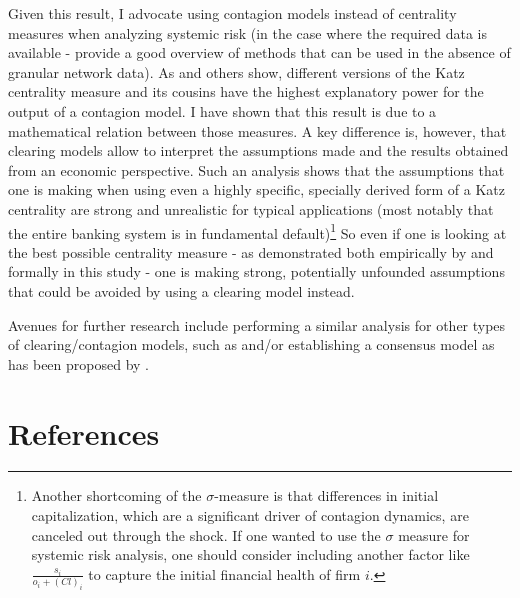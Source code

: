 \documentclass[authoryear,12pt]{elsarticle}
\begin{document}
Given this result, I advocate using contagion models instead of centrality measures when analyzing systemic risk (in the case where the required data is available - \cite{Anand2015} provide a good overview of methods that can be used in the absence of granular network data). As \cite{Puhr2014} and others show, different versions of the Katz centrality measure and its cousins have the highest explanatory power for the output of a contagion model. I have shown that this result is due to a mathematical relation between those measures. A key difference is, however, that clearing models allow to interpret the assumptions made and the results obtained from an economic perspective. Such an analysis shows that the assumptions that one is making when using even a highly specific, specially derived form of a Katz centrality are strong and unrealistic for typical applications (most notably that the entire banking system is in fundamental default)\footnote{Another shortcoming of the $\sigma$-measure is that differences in initial capitalization, which are a significant driver of contagion dynamics, are canceled out through the shock. If one wanted to use the $\sigma$ measure for systemic risk analysis, one should consider including another factor like $\frac{s_i}{o_i + (Cl)_i}$ to capture the initial financial health of firm $i$.} So even if one is looking at the best possible centrality measure - as demonstrated both empirically by \cite{Puhr2014} and formally in this study - one is making strong, potentially unfounded assumptions that could be avoided by using a clearing model instead. 

Avenues for further research include performing a similar analysis for other types of clearing/contagion models, such as \cite{Furfine2003,Battiston2012} and/or establishing a consensus model as has been proposed by \cite{Barucca2016}.

\section*{References}\label{sec_References}


\end{document}
